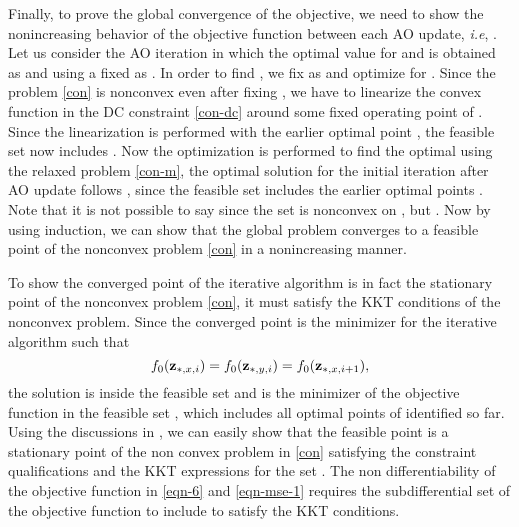Finally, to prove the global convergence of the objective, we need to show the nonincreasing behavior of the objective function between each \ac{AO} update, \textit{i.e}, . Let us consider the \ac{AO} iteration  in which the optimal value for \eqn{\mx} and \eqn{\mz} is obtained as  and  using a fixed \eqn{\my} as . In order to find , we fix \eqn{\mx} as  and optimize for \me{\my}. Since the problem \eqref{con} is nonconvex even after fixing \me{\mx}, we have to linearize the convex function in the \ac{DC} constraint \eqref{con-dc} around some fixed operating point of \me{\my}. Since the linearization is performed with the earlier optimal point , the feasible set now includes . Now the optimization is performed to find the optimal \me{\my} using the relaxed problem \eqref{con-m}, the optimal solution  for the initial iteration after \ac{AO} update follows , since the feasible set includes the earlier optimal points . Note that it is not possible to say  since the set is nonconvex on \me{\mx,\my}, but . Now by using induction, we can show that the global problem converges to a feasible point of the nonconvex problem \eqref{con} in a nonincreasing manner.

To show the converged point of the iterative algorithm is in fact the stationary point of the nonconvex problem \eqref{con}, it must satisfy the \ac{KKT} conditions of the nonconvex problem. Since the converged point is the minimizer for the iterative algorithm such that 
\begin{equation} \label{con-opt}
f_0(\mz_{\ast,x,i}) = f_0(\mz_{\ast,y,i}) = f_0(\mz_{\ast,x,i+1}),
\end{equation}
the solution is inside the feasible set  and  is the minimizer of the objective function  in the feasible set , which includes all optimal points of \me{\mz} identified so far. Using the discussions in \cite{marks1978technical}, we can easily show that the feasible point  is a stationary point of the non convex problem in \eqref{con} satisfying the constraint qualifications and the \ac{KKT} expressions for the set . The non differentiability of the objective function in \eqref{eqn-6} and \eqref{eqn-mse-1} requires the subdifferential set of the objective function to include  to satisfy the \ac{KKT} conditions.


